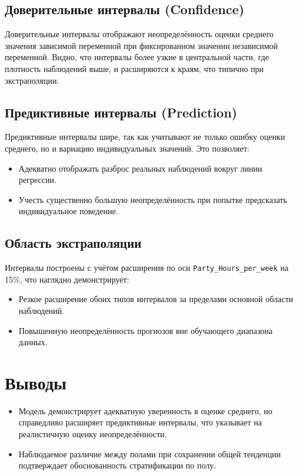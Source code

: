 \subsection*{Доверительные интервалы (Confidence)}
Доверительные интервалы отображают неопределённость оценки среднего значения зависимой переменной при фиксированном значении независимой переменной. Видно, что интервалы более узкие в центральной части, где плотность наблюдений выше, и расширяются к краям, что типично при экстраполяции.

\subsection*{Предиктивные интервалы (Prediction)}
Предиктивные интервалы шире, так как учитывают не только ошибку оценки среднего, но и вариацию индивидуальных значений. Это позволяет:
\begin{itemize}
	\item Адекватно отображать разброс реальных наблюдений вокруг линии регрессии.
	\item Учесть существенно большую неопределённость при попытке предсказать индивидуальное поведение.
\end{itemize}

\subsection*{Область экстраполяции}
Интервалы построены с учётом расширения по оси \texttt{Party\_Hours\_per\_week} на 15\%, что наглядно демонстрирует:
\begin{itemize}
	\item Резкое расширение обоих типов интервалов за пределами основной области наблюдений.
	\item Повышенную неопределённость прогнозов вне обучающего диапазона данных.
\end{itemize}

\section*{Выводы}
\begin{itemize}
	\item Модель демонстрирует адекватную уверенность в оценке среднего, но справедливо расширяет предиктивные интервалы, что указывает на реалистичную оценку неопределённости.
	\item Наблюдаемое различие между полами при сохранении общей тенденции подтверждает обоснованность стратификации по полу.
\end{itemize}
